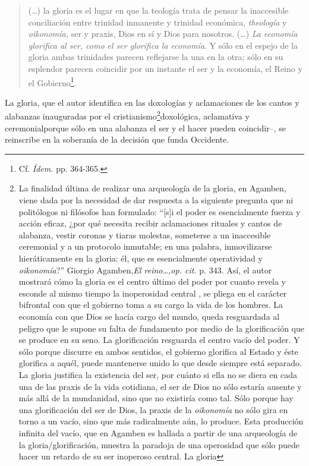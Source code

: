 \begin{quote}
(\dots) la gloria es el lugar en que la teología trata de pensar la inaccesible conciliación entre trinidad inmanente y trinidad económica, \emph{theología} y \emph{oikonomía,} ser y praxis, Dios en sí y Dios para nosotros. (\dots) \emph{La economía glorifica al ser, como el ser glorifica la economía}. Y sólo en el espejo de la gloria ambas trinidades parecen reflejarse la una en la otra; sólo en su esplendor parecen coincidir por un instante el ser y la economía, el Reino y el Gobierno\footnote{Cf. \emph{Ídem.} pp. 364-365.}.
\end{quote}

La gloria, que el autor identifica en las doxologías y aclamaciones de los cantos y alabanzas inauguradas por el cristianismo\footnote{La finalidad última de realizar una arqueología de la gloria, en Agamben, viene dada por la necesidad de dar respuesta a la siguiente pregunta que ni politólogos ni filósofos han formulado: \enquote{{[}s{]}i el poder es esencialmente fuerza y acción eficaz, ¿por qué necesita recibir aclamaciones rituales y cantos de alabanza, vestir coronas y tiaras molestas, someterse a un inaccesible ceremonial y a un protocolo inmutable; en una palabra, inmovilizarse hieráticamente en la gloria: él, que es esencialmente operatividad y \emph{oikonomía}?} Giorgio Agamben,\emph{El reino\ldots,op. cit.} p. 343. Así, el autor mostrará cómo la gloria es el centro último del poder por cuanto revela y esconde al mismo tiempo la inoperosidad central , se pliega en el carácter bifrontal con que el gobierno toma a su cargo la vida de los hombres. La economía con que Dios se hacía cargo del mundo, queda resguardada al peligro que le supone su falta de fundamento por medio de la glorificación que se produce en su seno. La glorificación resguarda el centro vacío del poder. Y sólo porque discurre en ambos sentidos, el gobierno glorifica al Estado y éste glorifica a aquél, puede mantenerse unido lo que desde siempre está separado. La gloria justifica la existencia del ser, por cuánto si ella no se diera en cada una de las praxis de la vida cotidiana, el ser de Dios no sólo estaría ausente y más allá de la mundanidad, sino que no existiría como tal. Sólo porque hay una glorificación del ser de Dios, la praxis de la \emph{oikonomía} no sólo gira en torno a un vacío, sino que más radicalmente aún, lo produce. Esta producción infinita del vacío, que en Agamben es hallada a partir de una arqueología de la gloria/glorificación, muestra la paradoja de una operosidad que sólo puede hacer un retardo de su ser inoperoso central. La gloria }doxológica, aclamativa y ceremonialporque sólo en una alabanza el ser y el hacer pueden coincidir--, se reinscribe en la soberanía de la decisión que funda Occidente.


